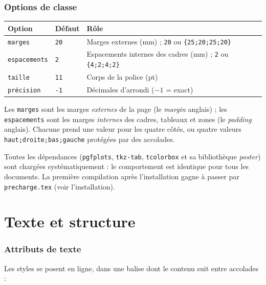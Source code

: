 \documentclass[11pt,a4paper]{article}
\newcommand{\opt}[1]{\texttt{\textcolor{Accent}{#1}}}
\begin{document}
\section{Options de classe}


\begin{longtable}{@{}lll@{}}
\toprule
\textbf{Option} & \textbf{Défaut} & \textbf{Rôle} \\
\midrule
\opt{marges} & \texttt{20} & Marges externes (mm) ; \texttt{20} ou \texttt{\{25;20;25;20\}} \\
\opt{espacements} & \texttt{2} & Espacements internes des cadres (mm) ; \texttt{2} ou \texttt{\{4;2;4;2\}} \\
\opt{taille} & \texttt{11} & Corps de la police (pt) \\
\opt{précision} & \texttt{-1} & Décimales d'arrondi ($-1$ = exact) \\
\bottomrule
\end{longtable}

Les \opt{marges} sont les marges \emph{externes} de la page (le
\emph{margin} anglais) ; les \opt{espacements} sont les marges
\emph{internes} des cadres, tableaux et zones (le \emph{padding}
anglais). Chacune prend une valeur pour les quatre côtés, ou quatre
valeurs \texttt{haut;droite;bas;gauche} protégées par des accolades.

Toutes les dépendances (\texttt{pgfplots}, \texttt{tkz-tab},
\texttt{tcolorbox} et sa bibliothèque \emph{poster}) sont chargées
systématiquement : le comportement est identique pour tous les
documents. La première compilation après l'installation gagne à passer
par \texttt{precharge.tex} (voir l'installation).

\part{Texte et structure}

\section{Attributs de texte}

Les styles se posent en ligne, dans une balise dont le contenu suit
entre accolades :
\end{document}
